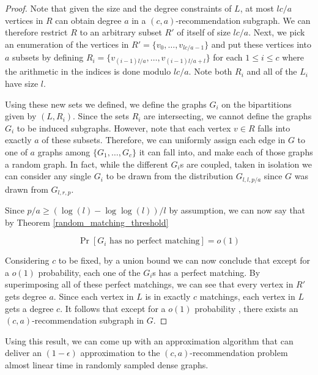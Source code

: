 \begin{proof}
Note that given the size and the degree constraints of $L$, at most $lc/a$
vertices in $R$ can obtain degree $a$ in a $(c,a)$-recommendation subgraph. We
can therefore restrict $R$ to an arbitrary subset $R'$ of itself of size $lc/a$.
Next, we pick an enumeration of the vertices in $R'=\{v_0,\ldots, v_{lc/a-1}\}$
and put these vertices into $a$ subsets by defining
$R_i = \{v_{(i-1)l/a}, \ldots, v_{(i-1)l/a+l}\}$ for each $1\leq i\leq c$ where
the arithmetic in the indices is done modulo $lc/a$. Note both $R_i$ and all of
the $L_i$ have size $l$. \vs

Using these new sets we defined, we define the graphs $G_i$ on the bipartitions
given by $(L, R_i)$. Since the sets $R_i$ are intersecting, we cannot define the
graphs $G_i$ to be induced subgraphs. However, note that each vertex $v\in R$
falls into exactly $a$ of these subsets. Therefore, we can uniformly assign each
edge in $G$ to one of $a$ graphs among $\{G_1,\ldots, G_c\}$ it can fall into,
and make each of those graphs a random graph. In fact, while the different
$G_i$s are coupled, taken in isolation we can consider any single $G_i$ to be
drawn from the distribution $G_{l,l,p/a}$ since $G$ was drawn from $G_{l,r,p}$.
\vs

Since $p/a \geq (\log(l)-\log\log(l))/l$ by assumption, we can now say that by
Theorem \ref{random_matching_threshold} 

\[ \Pr[\text{$G_i$ has no perfect matching}] = o(1) \]

Considering $c$ to be fixed, by a union bound we can now conclude that except
for a $o(1)$ probability, each one of the $G_i$s has a perfect matching. By
superimposing all of these perfect matchings, we can see that every vertex in
$R'$ gets degree $a$. Since each vertex in $L$ is in exactly $c$ matchings, each
vertex in $L$ gets a degree $c$. It follows that except for a $o(1)$ probability
, there exists an $(c,a)$-recommendation subgraph in $G$.
\end{proof}

Using this result, we can come up with an approximation algorithm that can
deliver an $(1-\epsilon)$ approximation to the $(c,a)$-recommendation problem
almost linear time in randomly sampled dense graphs.

